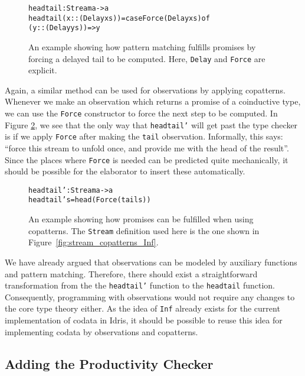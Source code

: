 \begin{figure}
\begin{alltt}
headtail : Stream a -> a
headtail (x :: (Delay xs)) = case Force (Delay xs) of
                               (y :: (Delay ys)) => y
\end{alltt}
\caption{An example showing how pattern matching fulfills promises by forcing a delayed tail to be computed. Here, \texttt{Delay} and \texttt{Force} are explicit.}
\label{fig:headtail}
\end{figure}

Again, a similar method can be used for observations by applying copatterns. Whenever we make an observation which returns a promise of a coinductive type,
we can use the \texttt{Force} constructor to force the next step to be computed. In Figure \ref{fig:headtail_copatterns}, we see that the only way that \texttt{headtail'} will get past the type checker is if we apply \texttt{Force} after making the \texttt{tail} observation. Informally, this says: ``force this stream to unfold once, and provide me with the head of the result''. Since the places where \texttt{Force} is needed can be predicted quite mechanically, it should be possible for the elaborator to insert these automatically.

\begin{figure}
\begin{alltt}
headtail' : Stream a -> a
headtail' s = head (Force (tail s))
\end{alltt}
\caption{An example showing how promises can be fulfilled when using copatterns. The \texttt{Stream} definition used here is the one shown in Figure~\ref{fig:stream_copatterns_Inf}.}
\label{fig:headtail_copatterns}
\end{figure}

We have already argued that observations can be modeled by auxiliary functions and pattern matching. Therefore, there should exist a straightforward transformation from the the \texttt{headtail'} function to the \texttt{headtail} function. Consequently, programming with observations would not require any changes to the core type theory either. As the idea of \texttt{Inf} already exists for the current implementation of codata in Idris, it should be possible to reuse this idea for implementing codata by observations and copatterns.

\subsection{Adding the Productivity Checker}
\label{sec:copattern_in_idris_productivity_checker}

